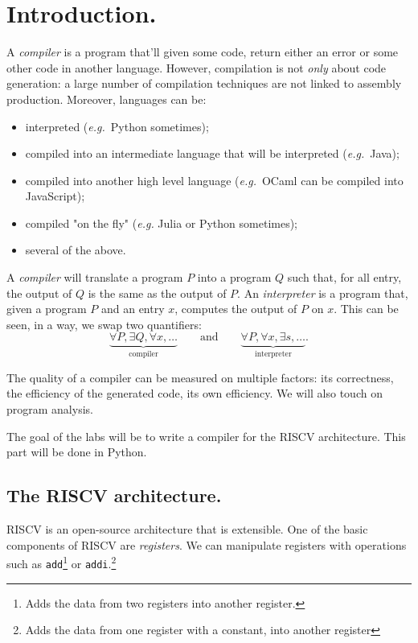 \documentclass[./main]{subfiles}
\begin{document}
  \chapter{Introduction.}

  \vspace{-1em}
  A \textit{compiler} is a program that'll given some code, return either an error or some other code in another language.
  However, compilation is not \textit{only} about code generation: a large number of compilation techniques are not linked to assembly production.
  Moreover, languages can be:
  \begin{itemize}
    \item interpreted (\textit{e.g.}\ Python sometimes);
    \item compiled into an intermediate language that will be interpreted (\textit{e.g.}\ Java);
    \item compiled into another high level language (\textit{e.g.}\ OCaml can be compiled into JavaScript);
    \item compiled "on the fly" (\textit{e.g.} Julia or Python sometimes);
    \item several of the above.
  \end{itemize}

  A \textit{compiler} will translate a program $P$ into a program $Q$ such that, for all entry, the output of $Q$ is the same as the output of $P$.
  An \textit{interpreter} is a program that, given a program $P$ and an entry $x$, computes the output of $P$ on $x$.
  This can be seen, in a way, we swap two quantifiers:
  \[
    \underbrace{\forall P, \exists Q, \forall x, \ldots}_{\text{compiler}}
    \quad\quad \text{and}\quad\quad
    \underbrace{\forall P, \forall x, \exists s, \ldots}_{\text{interpreter}}
  .\]

  The quality of a compiler can be measured on multiple factors: its correctness, the efficiency of the generated code, its own efficiency.
  We will also touch on program analysis.

  The goal of the labs will be to write a compiler for the RISCV architecture.
  This part will be done in Python.

  \section{The RISCV architecture.}

  RISCV is an open-source architecture that is extensible.
  One of the basic components of RISCV are \textit{registers}.
  We can manipulate registers with operations such as
  \texttt{add}\footnote{Adds the data from two registers into another register.} or
  \texttt{addi}.\footnote{Adds the data from one register with a constant, into another register}
  \showfootnote
\end{document}
